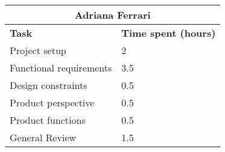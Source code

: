 \begin{table}[h]
  \center
  \begin{tabular}{l|l}
    \multicolumn{2}{c}{\textbf{Adriana Ferrari}} \\
    \hline
    \textbf{Task} & \textbf{Time spent (hours)}\\
    \hline
    Project setup & 2 \\
    Functional requirements & 3.5 \\
    Design constraints & 0.5 \\
    Product perspective & 0.5 \\
    Product functions & 0.5 \\
    General Review & 1.5
  \end{tabular}
\end{table}